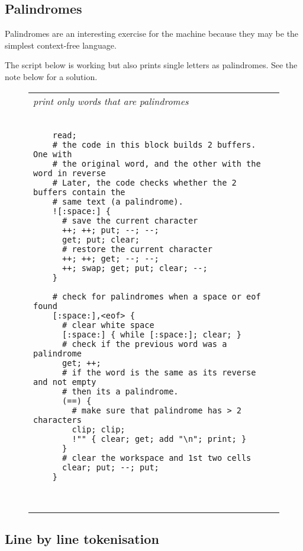 \documentclass[a4paper,12pt]{article}
\begin{document}
\subsection{Palindromes}

  Palindromes are an interesting exercise for the machine because
  they may be the simplest context-free language.

  The script below is working but also prints single letters
  as palindromes. See the note below for a solution.
 \begin{figure}
 \begin{tabular}{ l }
 \emph{ print only words that are palindromes } \\ 
 \begin{lstlisting}[breaklines] 

    read; 
    # the code in this block builds 2 buffers. One with 
    # the original word, and the other with the word in reverse
    # Later, the code checks whether the 2 buffers contain the 
    # same text (a palindrome).
    ![:space:] {
      # save the current character
      ++; ++; put; --; --;
      get; put; clear;
      # restore the current character
      ++; ++; get; --; --;
      ++; swap; get; put; clear; --;
    } 

    # check for palindromes when a space or eof found
    [:space:],<eof> { 
      # clear white space
      [:space:] { while [:space:]; clear; }
      # check if the previous word was a palindrome
      get; ++; 
      # if the word is the same as its reverse and not empty
      # then its a palindrome. 
      (==) { 
        # make sure that palindrome has > 2 characters
        clip; clip; 
        !"" { clear; get; add "\n"; print; }
      } 
      # clear the workspace and 1st two cells
      clear; put; --; put;
    }

  
 \end{lstlisting} 
 \end{tabular} 

 \end{figure}


\subsection{Line by line tokenisation}
\end{document}
